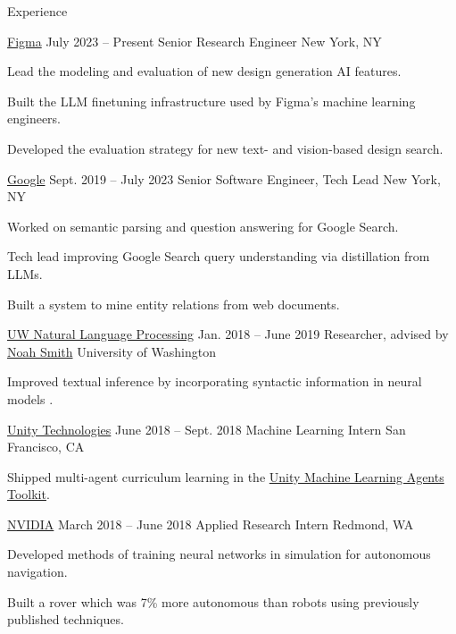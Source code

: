 \documentclass{resume}
\begin{document}
\begin{rSection}{Experience}
	\begin{rSubsection}{\href{https://www.figma.com/careers/}
			{Figma}}
		{July 2023 -- Present}
		{Senior Research Engineer}
		{New York, NY}
		\item Lead the modeling and evaluation of new design generation AI features.
		\item Built the LLM finetuning infrastructure used by Figma's machine learning engineers.
		\item Developed the evaluation strategy for new text- and vision-based design search.
	\end{rSubsection}

	\begin{rSubsection}{\href{https://careers.google.com/locations/new-york/}
			{Google}}
		{Sept. 2019 -- July 2023}
		{Senior Software Engineer, Tech Lead}
		{New York, NY}
		\item Worked on semantic parsing and question answering for Google Search.
		\item Tech lead improving Google Search query understanding via distillation from LLMs.
		\item Built a system to mine entity relations from web documents.
	\end{rSubsection}

	\begin{rSubsection}{\href{https://nlp.washington.edu/}
			{UW Natural Language Processing}}
		{Jan. 2018 -- June 2019}
		{Researcher, advised by
			\href{https://homes.cs.washington.edu/~nasmith/}
			{Noah Smith}}
		{University of Washington}
		\item Improved textual inference by incorporating syntactic
		information in neural models \citep{pang2019improving}.
	\end{rSubsection}

	\begin{rSubsection}{{\href{https://unity.com/}{Unity Technologies}}}
		{June 2018 -- Sept. 2018}
		{Machine Learning Intern}
		{San Francisco, CA}
		\item Shipped multi-agent curriculum learning in the
		\href{https://unity.com/products/machine-learning-agents}
		{Unity Machine Learning Agents Toolkit}.
	\end{rSubsection}

	\begin{rSubsection}{{\href{http://www.nvidia.com/page/home.html}{NVIDIA}}}
		{March 2018 -- June 2018}
		{Applied Research Intern}
		{Redmond, WA}
		\item Developed methods of training neural networks in simulation for autonomous navigation.
		\item Built a rover which was 7\% more autonomous than robots using previously published
		techniques.
	\end{rSubsection}


\end{rSection}
\end{document}
